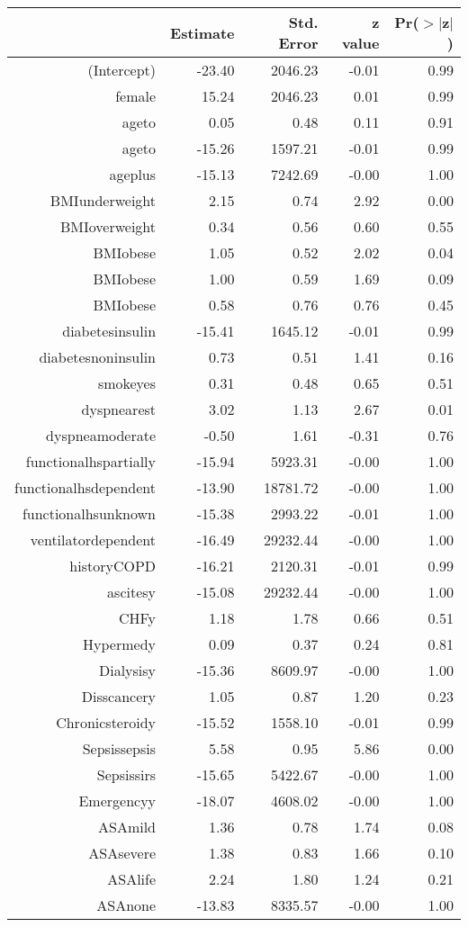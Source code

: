 \bigskip\bigskip
\centering
\begin{tabular}{rrrrr}
  \hline
 & Estimate & Std. Error & z value & Pr($>$$|$z$|$) \\ 
  \hline
(Intercept) & -23.40 & 2046.23 & -0.01 & 0.99 \\ 
  female & 15.24 & 2046.23 & 0.01 & 0.99 \\ 
  age\-65\-to\-74 & 0.05 & 0.48 & 0.11 & 0.91 \\ 
  age\-75\-to\-84 & -15.26 & 1597.21 & -0.01 & 0.99 \\ 
  age\-85\-plus & -15.13 & 7242.69 & -0.00 & 1.00 \\ 
  BMI\-underweight & 2.15 & 0.74 & 2.92 & 0.00 \\ 
  BMI\-overweight & 0.34 & 0.56 & 0.60 & 0.55 \\ 
  BMI\-obese\-1 & 1.05 & 0.52 & 2.02 & 0.04 \\ 
  BMI\-obese\-2 & 1.00 & 0.59 & 1.69 & 0.09 \\ 
  BMI\-obese\-3 & 0.58 & 0.76 & 0.76 & 0.45 \\ 
  diabetes\-insulin & -15.41 & 1645.12 & -0.01 & 0.99 \\ 
  diabetes\-noninsulin & 0.73 & 0.51 & 1.41 & 0.16 \\ 
  smoke\-yes & 0.31 & 0.48 & 0.65 & 0.51 \\ 
  dyspnea\-rest & 3.02 & 1.13 & 2.67 & 0.01 \\ 
  dyspnea\-moderate & -0.50 & 1.61 & -0.31 & 0.76 \\ 
  functional\-hs\-partially & -15.94 & 5923.31 & -0.00 & 1.00 \\ 
  functional\-hs\-dependent & -13.90 & 18781.72 & -0.00 & 1.00 \\ 
  functional\-hs\-unknown & -15.38 & 2993.22 & -0.01 & 1.00 \\ 
  ventilator\-dependent & -16.49 & 29232.44 & -0.00 & 1.00 \\ 
  history\-COPD & -16.21 & 2120.31 & -0.01 & 0.99 \\ 
  ascites\-y & -15.08 & 29232.44 & -0.00 & 1.00 \\ 
  CHF\-y & 1.18 & 1.78 & 0.66 & 0.51 \\ 
  Hyper\-med\-y & 0.09 & 0.37 & 0.24 & 0.81 \\ 
  Dialysis\-y & -15.36 & 8609.97 & -0.00 & 1.00 \\ 
  Diss\-cancer\-y & 1.05 & 0.87 & 1.20 & 0.23 \\ 
  Chronic\-steroid\-y & -15.52 & 1558.10 & -0.01 & 0.99 \\ 
  Sepsis\-sepsis & 5.58 & 0.95 & 5.86 & 0.00 \\ 
  Sepsis\-sirs & -15.65 & 5422.67 & -0.00 & 1.00 \\ 
  Emergency\-y & -18.07 & 4608.02 & -0.00 & 1.00 \\ 
  ASA\-mild & 1.36 & 0.78 & 1.74 & 0.08 \\ 
  ASA\-severe & 1.38 & 0.83 & 1.66 & 0.10 \\ 
  ASA\-life & 2.24 & 1.80 & 1.24 & 0.21 \\ 
  ASA\-none & -13.83 & 8335.57 & -0.00 & 1.00 \\ 
   \hline
\end{tabular}
